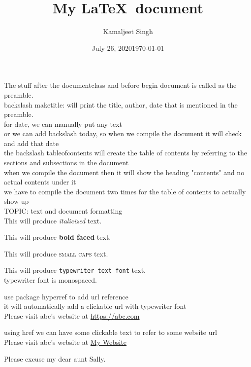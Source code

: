 \documentclass[11pt]{article}
\title{My \LaTeX\ document}
\author{Kamaljeet Singh}
\date{July 26, 2020}
\date{\today}
\begin{document}
\tableofcontents
\maketitle


The stuff after the documentclass and before begin document is called as the preamble.\\

backslash maketitle: will print the title, author, date that is mentioned in the preamble.\\

for date, we can manually put any text\\
or we can add backslash today, so when we compile the document it will check and add that date\\

the backslash tableofcontents will create the table of contents by referring to the sections and subsections in the document\\
when we compile the document then it will show the heading "contents" and no actual contents under it\\
we have to compile the document two times for the table of contents to actually show up\\

TOPIC: text and document formatting\\

This will produce \textit{italicized} text.

This will produce \textbf{bold faced} text.

This will produce \textsc{small caps} text.

This will produce \texttt{typewriter text font} text.\\
typewriter font is monospaced.

use package hyperref to add url reference\\
it will automatically add a clickable url with typewriter font\\
Please visit abc's website at \url{https://abc.com}

\vspace{1cm}

using href we can have some clickable text to refer to some website url\\
Please visit abc's website at \href{https://abc.com}{My Website}

\vspace{1cm}

Please excuse my dear aunt Sally.\\
\end{document}
